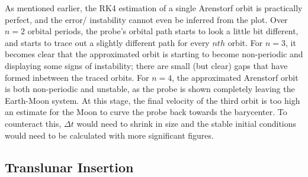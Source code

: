 \documentclass[conf]{new-aiaa}
\begin{document}
    As mentioned earlier, the RK4 estimation of a single Arenstorf orbit is practically perfect, and the error/ instability cannot even be inferred from the plot. Over $n=2$ orbital periods, the probe's orbital path starts to look a little bit different, and starts to trace out a slightly different path for every $nth$ orbit. For $n=3$, it becomes clear that the approximated orbit is starting to become non-periodic and displaying some signs of instability; there are small (but clear) gaps that have formed inbetween the traced orbits. For $n=4$, the approximated Arenstorf orbit is both non-periodic and unstable, as the probe is shown completely leaving the Earth-Moon system. At this stage, the final velocity of the third orbit is too high an estimate for the Moon to curve the probe back towards the barycenter. To counteract this, $\Delta t$ would need to shrink in size and the stable initial conditions would need to be calculated with more significant figures.
    \subsection{Translunar Insertion}
    
\end{document}
